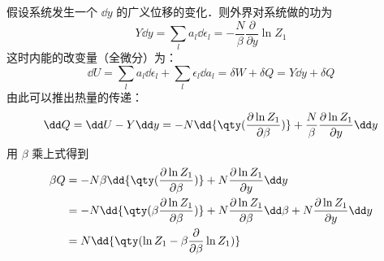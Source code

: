 假设系统发生一个 $\dd y$ 的广义位移的变化．则外界对系统做的功为
\begin{equation}
Y\dd y=\sum_l a_l\dd \epsilon_l=-\frac{N}{\beta}\frac{\partial }{\partial y}\ln Z_1
\end{equation}
这时内能的改变量（全微分）为：
\begin{equation}
\dd U=\sum_l a_l\dd \epsilon_l+\sum_l\epsilon_l\dd a_l=\delta W+\delta Q=Y\dd y+\delta Q
\end{equation}
由此可以推出热量的传递：
\begin{equation}
\dd Q=\dd U-Y\dd y=
-N\dd{\qty(\frac{\partial \ln Z_1}{\partial \beta})}+\frac{N}{\beta}\frac{\partial \ln Z_1}{\partial y}\dd y
\end{equation}
用 $\beta$ 乘上式得到
\begin{equation}
\begin{aligned}
\beta Q&=-N\beta\dd{\qty(\frac{\partial \ln Z_1}{\partial \beta})}+N\frac{\partial \ln Z_1}{\partial y}\dd y\\
&=-N\dd{\qty(\beta\frac{\partial \ln Z_1}{\partial \beta})}+N\frac{\partial \ln Z_1}{\partial \beta}\dd \beta+N\frac{\partial \ln Z_1}{\partial y}\dd y\\
&=N\dd{\qty(\ln Z_1-\beta\frac{\partial }{\partial \beta}\ln Z_1)}
\end{aligned}
\end{equation}

